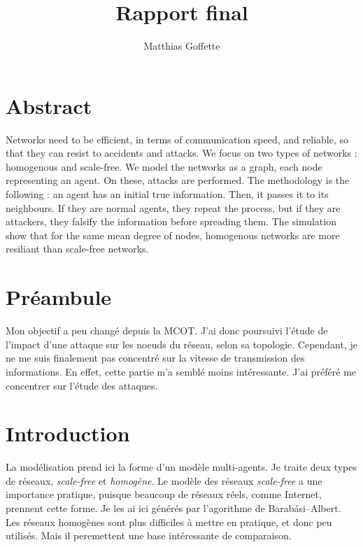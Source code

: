 \documentclass[11pt,a4paper]{article}
\title{Rapport final}
\author{Matthias Goffette}
\begin{document}
\maketitle

\section{Abstract} %

	Networks need to be efficient, in terms of communication speed, and reliable, so that they can resist to accidents and attacks. We focus on two types of networks : homogenous and scale-free. We model the networks as a graph, each node representing an agent. On these, attacks are performed. The methodology is the following : an agent has an initial true information. Then, it passes it to its neighbours. If they are normal agents, they repeat the process, but if they are attackers, they falsify the information before spreading them. The simulation show that for the same mean degree of nodes, homogenous networks are more resiliant than scale-free networks.



\section{Préambule} %

	Mon objectif a peu changé depuis la MCOT. J'ai donc poursuivi l'étude de l'impact d'une attaque sur les noeuds du réseau, selon sa topologie. Cependant, je ne me suis finalement pas concentré sur la vitesse de transmission des informations. En effet, cette partie m'a semblé moins intéressante. J'ai préféré me concentrer sur l'étude des attaques.


\section{Introduction} %
	
La modélisation prend ici la forme d'un modèle multi-agents. Je traite deux types de réseaux, \emph{scale-free} et \emph{homogène}. Le modèle des réseaux \emph{scale-free} a une importance pratique, puisque beaucoup de réseaux réels, comme Internet, prennent cette forme. Je les ai ici générés par l'agorithme de Barabási–Albert. Les réseaux homogènes sont plus difficiles à mettre en pratique, et donc peu utilisés. Mais il peremettent une base intéressante de comparaison.
\end{document}
